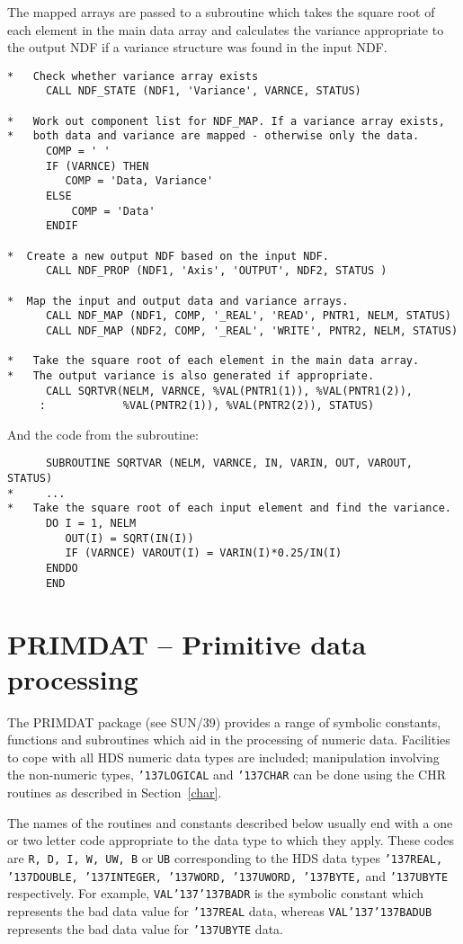 \documentclass[twoside,11pt]{article}
\renewcommand{\_}{{\tt\char'137}}
\newcommand{\xref}[3]{#1}
\newcommand{\xlabel}[1]{}
\begin{document}
The mapped arrays are passed to a subroutine which takes the square root of
each element in the main data array and calculates the variance appropriate
to the output NDF if a variance structure was found  in the input NDF.
\begin{verbatim}
*   Check whether variance array exists
      CALL NDF_STATE (NDF1, 'Variance', VARNCE, STATUS)

*   Work out component list for NDF_MAP. If a variance array exists,
*   both data and variance are mapped - otherwise only the data.
      COMP = ' '
      IF (VARNCE) THEN
         COMP = 'Data, Variance'
      ELSE
          COMP = 'Data'
      ENDIF

*  Create a new output NDF based on the input NDF.
      CALL NDF_PROP (NDF1, 'Axis', 'OUTPUT', NDF2, STATUS )

*  Map the input and output data and variance arrays.
      CALL NDF_MAP (NDF1, COMP, '_REAL', 'READ', PNTR1, NELM, STATUS)
      CALL NDF_MAP (NDF2, COMP, '_REAL', 'WRITE', PNTR2, NELM, STATUS)

*   Take the square root of each element in the main data array.
*   The output variance is also generated if appropriate.
      CALL SQRTVR(NELM, VARNCE, %VAL(PNTR1(1)), %VAL(PNTR1(2)),
     :            %VAL(PNTR2(1)), %VAL(PNTR2(2)), STATUS)
\end{verbatim}
And the code from the subroutine:
\begin{verbatim}
      SUBROUTINE SQRTVAR (NELM, VARNCE, IN, VARIN, OUT, VAROUT, STATUS)
*     ...
*   Take the square root of each input element and find the variance.
      DO I = 1, NELM
         OUT(I) = SQRT(IN(I))
         IF (VARNCE) VAROUT(I) = VARIN(I)*0.25/IN(I)
      ENDDO
      END
\end{verbatim}

\newpage
\section{PRIMDAT -- Primitive data processing\label{prim}\xlabel{primdat}}

The PRIMDAT package (see \xref{SUN/39}{sun39}{}) provides a range of symbolic
constants, functions and subroutines which aid in the processing of numeric
data.
Facilities to cope with all HDS numeric data types
are included;
manipulation involving the non-numeric types, {\tt \_LOGICAL} and {\tt\_CHAR}
can be done using the CHR routines as described in Section~\ref{char}.

The names of the routines and constants described below usually end with a
one or two letter code appropriate to the data type to which they apply.
These codes are {\tt R, D, I, W, UW, B} or {\tt UB}  corresponding to the
HDS data types {\tt \_REAL,
\_DOUBLE, \_INTEGER, \_WORD, \_UWORD, \_BYTE,} and {\tt\_UBYTE} respectively.
For example, {\tt VAL\_\_BADR} is the symbolic constant which represents the bad
data value for  {\tt\_REAL} data, whereas {\tt VAL\_\_BADUB} represents the bad
data value for {\tt\_UBYTE} data.
\end{document}
